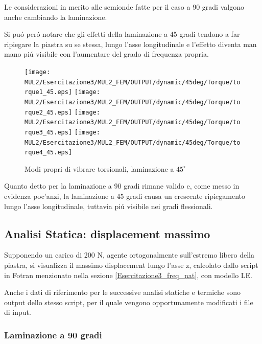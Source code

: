 \documentclass{article}
\begin{document}
        Le considerazioni in merito alle semionde fatte per il caso a 90 gradi valgono anche cambiando la laminazione.

        Si puó peró notare che gli effetti della laminazione a 45 gradi tendono a far ripiegare la piastra
        su se stessa, lungo l'asse longitudinale e l'effetto diventa man mano piú visibile con l'aumentare del grado di 
        frequenza propria.

        \clearpage

        \begin{figure}[h!]
             \label{fig:freq_nat_torque_45}
            \texttt{[image: MUL2/Esercitazione3/MUL2\_FEM/OUTPUT/dynamic/45deg/Torque/torque1\_45.eps]}
            \texttt{[image: MUL2/Esercitazione3/MUL2\_FEM/OUTPUT/dynamic/45deg/Torque/torque2\_45.eps]}
            \texttt{[image: MUL2/Esercitazione3/MUL2\_FEM/OUTPUT/dynamic/45deg/Torque/torque3\_45.eps]}
            \texttt{[image: MUL2/Esercitazione3/MUL2\_FEM/OUTPUT/dynamic/45deg/Torque/torque4\_45.eps]}
            \caption{Modi propri di vibrare torsionali, laminazione a $45^\circ$}
        \end{figure}

        Quanto detto per la laminazione a 90 gradi rimane valido e, come messo in evidenza poc'anzi, 
        la laminazione a 45 gradi causa un crescente ripiegamento lungo l'asse longitudinale, tuttavia piú visibile
        nei gradi flessionali.

        
        

            \clearpage

            \subsection{Analisi Statica: displacement massimo \label{displacement_massimo}}

            Supponendo un carico di 200 N, agente ortogonalmente sull'estremo libero della piastra, si visualizza il massimo displacement
            lungo l'asse z, calcolato dallo script in Fotran menzionato nella sezione \ref{Esercitazione3_freq_nat}, con modello LE.

            Anche i dati di riferimento per le successive analisi statiche e termiche sono output dello stesso script, per il quale vengono opportunamente
            modificati i file di input.

            \subsubsection{Laminazione a 90 gradi \label{displacement_massimo_90}}
\end{document}

